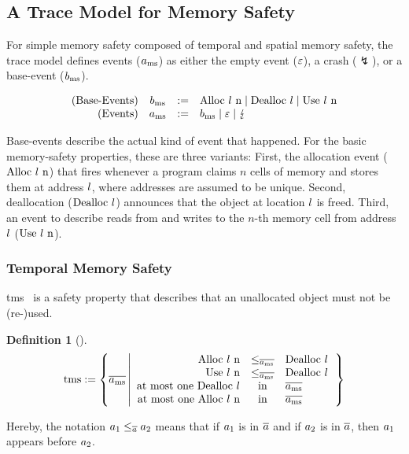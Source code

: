 \documentclass[dvipsnames,conference]{IEEEtran}
\theoremstyle{definition}
\newtheorem{definition}{Definition}[section]
\begin{document}
\subsection{A Trace Model for Memory Safety}\label{subsec:basic:memsafety:tracemodel}

For simple memory safety composed of temporal and spatial memory safety, the trace model defines events ($\event[_{\mssafe}]$) as either the empty event ($\emptyevent$), a crash ($\lightning$), or a base-event ($\preevent[_{\mssafe}]$).

\vspace{-1.0em}
\[
  \begin{array}{rcll}
    \text{(Base-Events)}&\preevent[_{\mssafe}] &:=& \ev{Alloc \loc\ n} \mid \ev{Dealloc \loc} \mid \ev{Use \loc\ n} \\
    \text{(Events)}&\event[_{\mssafe}] &:=& \preevent[_{\mssafe}] \mid \emptyevent \mid \lightning \\ 
  \end{array}
\]

Base-events describe the actual kind of event that happened.
For the basic memory-safety properties, these are three variants:
First, the allocation event ($\ev{Alloc\ \loc\ n}$) that fires whenever a program claims $n$ cells of memory and stores them at address $\loc$, where addresses are assumed to be unique.
Second, deallocation ($\ev{Dealloc\ \loc}$) announces that the object at location $\loc$ is freed.
Third, an event to describe reads from and writes to the $n$-th memory cell from address $\loc$ ($\ev{Use\ \loc\ n}$).

\subsubsection{Temporal Memory Safety}

\gls*{tms}~\cite{nagarakatte2010cets} is a safety property that describes that an unallocated object must not be (re-)used.

\begin{definition}[]\label{def:trace:tmsdef}
  $$
  \tmssafe:=\left\{\trace[_{\mssafe}] \left| \begin{array}{rcl}
    \ev{Alloc\ \loc\ n}&\le_{\trace[_{\mssafe}]}&\ev{Dealloc\ \loc} \\
    \ev{Use\ \loc\ n}&\le_{\trace[_{\mssafe}]}&\ev{Dealloc\ \loc} \\
    \text{at most one }\ev{Dealloc\ \loc}&\text{in}&\trace[_{\mssafe}] \\
    \text{at most one }\ev{Alloc\ \loc\ n}&\text{in}&\trace[_{\mssafe}] \\
  \end{array}\right.\right\}
  $$
\end{definition}
Hereby, the notation $\event[_{1}]\le_{\trace}\event[_{2}]$ means that if $\event[_{1}]$ is in $\trace$ and if $\event[_{2}]$ is in $\trace$, then $\event[_{1}]$ appears before $\event[_{2}]$.
\end{document}

